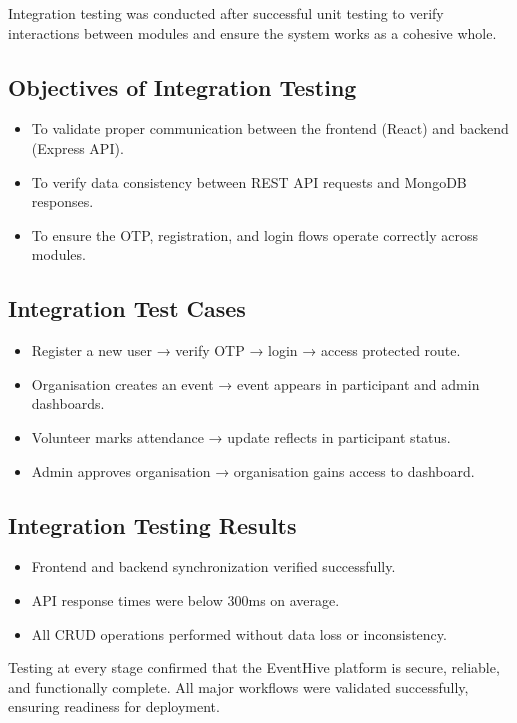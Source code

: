 \documentclass[12pt,a4paper]{report}
\begin{document}
Integration testing was conducted after successful unit testing to verify interactions between modules and ensure the system works as a cohesive whole.

\subsection*{Objectives of Integration Testing}
\begin{itemize}
    \item To validate proper communication between the frontend (React) and backend (Express API).
    \item To verify data consistency between REST API requests and MongoDB responses.
    \item To ensure the OTP, registration, and login flows operate correctly across modules.
\end{itemize}

\subsection*{Integration Test Cases}
\begin{itemize}
    \item Register a new user → verify OTP → login → access protected route.
    \item Organisation creates an event → event appears in participant and admin dashboards.
    \item Volunteer marks attendance → update reflects in participant status.
    \item Admin approves organisation → organisation gains access to dashboard.
\end{itemize}

\subsection*{Integration Testing Results}
\begin{itemize}
    \item Frontend and backend synchronization verified successfully.
    \item API response times were below 300ms on average.
    \item All CRUD operations performed without data loss or inconsistency.
\end{itemize}

\noindent
Testing at every stage confirmed that the EventHive platform is secure, reliable, and functionally complete. All major workflows were validated successfully, ensuring readiness for deployment.
\end{document}
